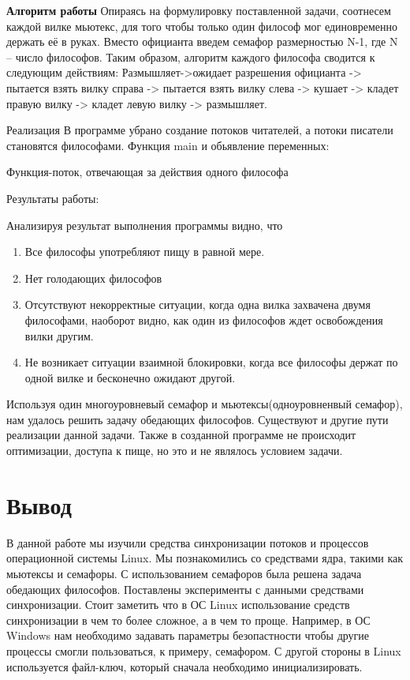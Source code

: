 \documentclass[a4paper]{article}
\begin{document}
\textbf{Алгоритм работы}
Опираясь на формулировку поставленной задачи, соотнесем каждой вилке мьютекс, для того чтобы только один философ мог единовременно держать её в руках. Вместо официанта введем семафор размерностью N-1, где N – число философов.
Таким образом, алгоритм каждого философа сводится к следующим действиям:
Размышляет->ожидает разрешения официанта -> пытается взять вилку справа -> пытается взять вилку слева -> кушает -> кладет правую вилку -> кладет левую вилку -> размышляет.


Реализация
В программе убрано создание потоков читателей, а потоки писатели становятся философами.
Функция main и обьявление переменных:
	
Функция-поток, отвечающая за действия одного философа
	
Результаты работы:
	
	

Анализируя результат выполнения программы видно, что
\begin{enumerate}
\item Все философы употребляют пищу в равной мере.
\item Нет голодающих философов
\item Отсутствуют некорректные ситуации, когда одна вилка захвачена двумя философами, наоборот видно, как один из философов ждет освобождения вилки другим.
\item Не возникает ситуации взаимной блокировки, когда все философы держат по одной вилке и бесконечно ожидают другой.
\end{enumerate}
Используя один многоуровневый семафор и мьютексы(одноуровненвый семафор), нам удалось решить задачу обедающих философов. Существуют и другие пути реализации данной задачи. Также в созданной программе не происходит оптимизации, доступа к пище, но это и не являлось условием задачи.

\section{Вывод}
В данной работе мы изучили средства синхронизации потоков и процессов операционной системы Linux. Мы познакомились со средствами ядра, такими как мьютексы и семафоры. С использованием семафоров была решена задача обедающих философов. Поставлены эксперименты с данными средствами синхронизации. Стоит заметить что в ОС Linux использование средств синхронизации в чем то более сложное, а в чем то проще. Например, в ОС Windows нам необходимо задавать параметры безопастности чтобы другие процессы смогли пользоваться, к примеру, семафором. С другой стороны в Linux используется файл-ключ, который сначала необходимо инициализировать. 
\end{document}
